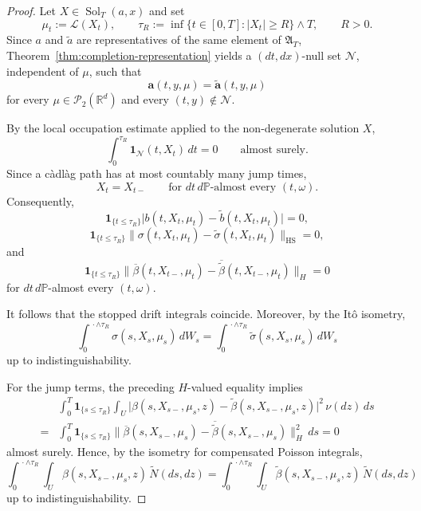 \documentclass[12pt,oneside, reqno]{amsart}
\numberwithin{equation}{section}
\begin{document}
	\begin{proof}
		Let \(X\in\operatorname{Sol}_T(a,x)\) and set
		\[
		\mu_t:=\mathcal L(X_t),
		\qquad
		\tau_R:=\inf\{t\in[0,T]:|X_t|\geq R\}\wedge T,
		\qquad R>0.
		\]
		Since \(a\) and \(\widetilde a\) are representatives of the same element
		of \(\mathfrak A_T\), Theorem~\ref{thm:completion-representation}
		yields a \((dt,dx)\)-null set \(\mathcal N\), independent of
		\(\mu\), such that
		\[
		\mathbf a(t,y,\mu)
		=
		\widetilde{\mathbf a}(t,y,\mu)
		\]
		for every \(\mu\in\mathcal P_2(\mathbb R^d)\) and every
		\((t,y)\notin\mathcal N\).
		
		By the local occupation estimate applied to the non-degenerate
		solution \(X\),
		\[
		\int_0^{\tau_R}
		\mathbf 1_{\mathcal N}(t,X_t)\,dt
		=0
		\qquad\text{almost surely}.
		\]
		Since a c\`adl\`ag path has at most countably many jump times,
		\[
		X_t=X_{t-}
		\qquad
		\text{for }dt\,d\mathbb P\text{-almost every }(t,\omega).
		\]
		Consequently,
		\[
		\mathbf 1_{\{t\leq\tau_R\}}
		\bigl|b(t,X_t,\mu_t)-\widetilde b(t,X_t,\mu_t)\bigr|
		=0,
		\]
		\[
		\mathbf 1_{\{t\leq\tau_R\}}
		\bigl\|\sigma(t,X_t,\mu_t)
		-\widetilde\sigma(t,X_t,\mu_t)\bigr\|_{\mathrm{HS}}
		=0,
		\]
		and
		\[
		\mathbf 1_{\{t\leq\tau_R\}}
		\bigl\|
		\overline\beta(t,X_{t-},\mu_t)
		-\overline{\widetilde\beta}(t,X_{t-},\mu_t)
		\bigr\|_H
		=0
		\]
		for \(dt\,d\mathbb P\)-almost every \((t,\omega)\).
		
		It follows that the stopped drift integrals coincide. Moreover, by
		the It\^o isometry,
		\[
		\int_0^{\,\cdot\wedge\tau_R}
		\sigma(s,X_s,\mu_s)\,dW_s
		=
		\int_0^{\,\cdot\wedge\tau_R}
		\widetilde\sigma(s,X_s,\mu_s)\,dW_s
		\]
		up to indistinguishability.
		
		For the jump terms, the preceding \(H\)-valued equality implies
		\[
		\begin{aligned}
			&\int_0^T
			\mathbf 1_{\{s\leq\tau_R\}}
			\int_U
			\bigl|
			\beta(s,X_{s-},\mu_s,z)
			-\widetilde\beta(s,X_{s-},\mu_s,z)
			\bigr|^2
			\,\nu(dz)\,ds
			\\
			=&
			\int_0^T
			\mathbf 1_{\{s\leq\tau_R\}}
			\bigl\|
			\overline\beta(s,X_{s-},\mu_s)
			-\overline{\widetilde\beta}(s,X_{s-},\mu_s)
			\bigr\|_H^2
			\,ds
			=0
		\end{aligned}
		\]
		almost surely. Hence, by the isometry for compensated Poisson
		integrals,
		\[
		\int_0^{\,\cdot\wedge\tau_R}\int_U
		\beta(s,X_{s-},\mu_s,z)\,\widetilde N(ds,dz)
		=
		\int_0^{\,\cdot\wedge\tau_R}\int_U
		\widetilde\beta(s,X_{s-},\mu_s,z)\,\widetilde N(ds,dz)
		\]
		up to indistinguishability.
		

\end{proof}
\end{document}
